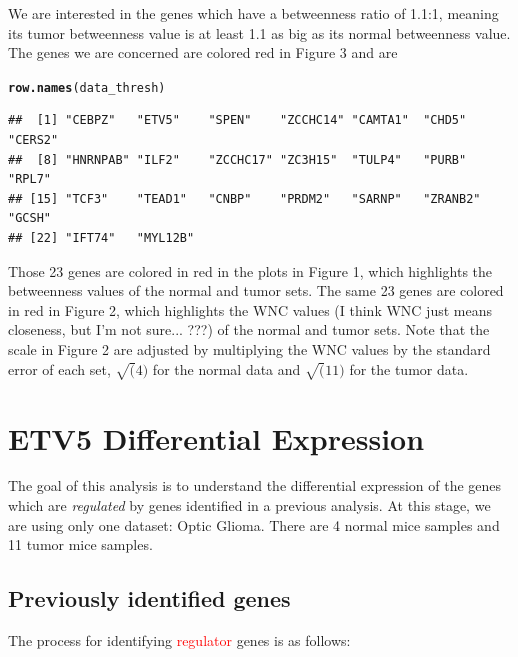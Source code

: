 \documentclass{article}\usepackage[]{graphicx}\usepackage[]{color}
\makeatletter
\newcommand{\hlstd}[1]{\textcolor[rgb]{0.345,0.345,0.345}{#1}}%
\newcommand{\hlkwd}[1]{\textcolor[rgb]{0.737,0.353,0.396}{\textbf{#1}}}%
\newenvironment{kframe}{%
 \def\at@end@of@kframe{}%
 \ifinner\ifhmode%
  \def\at@end@of@kframe{\end{minipage}}%
  \begin{minipage}{\columnwidth}%
 \fi\fi%
 \def\FrameCommand##1{\hskip\@totalleftmargin \hskip-\fboxsep
 \colorbox{shadecolor}{##1}\hskip-\fboxsep
     \hskip-\linewidth \hskip-\@totalleftmargin \hskip\columnwidth}%
 \MakeFramed {\advance\hsize-\width
   \@totalleftmargin\z@ \linewidth\hsize
   \@setminipage}}%
 {\par\unskip\endMakeFramed%
 \at@end@of@kframe}
\newenvironment{knitrout}{}{} %
\makeatother
\begin{document}
We are interested in the genes which have a betweenness ratio of 1.1:1, meaning its tumor betweenness value is at least 1.1 as big as its normal betweenness value. The genes we are concerned are colored red in Figure 3 and are
\begin{knitrout}\small
{}\color{fgcolor}\begin{kframe}
\begin{alltt}
\hlkwd{row.names}\hlstd{(data_thresh)}
\end{alltt}
\begin{verbatim}
##  [1] "CEBPZ"   "ETV5"    "SPEN"    "ZCCHC14" "CAMTA1"  "CHD5"    "CERS2"  
##  [8] "HNRNPAB" "ILF2"    "ZCCHC17" "ZC3H15"  "TULP4"   "PURB"    "RPL7"   
## [15] "TCF3"    "TEAD1"   "CNBP"    "PRDM2"   "SARNP"   "ZRANB2"  "GCSH"   
## [22] "IFT74"   "MYL12B"
\end{verbatim}
\end{kframe}
\end{knitrout}


Those 23 genes are colored in red in the plots in Figure 1, which highlights the betweenness values of the normal and tumor sets. The same 23 genes are colored in red in Figure 2, which highlights the WNC values (I think WNC just means closeness, but I'm not sure...  ???) of the normal and tumor sets. Note that the scale in Figure 2 are adjusted by multiplying the WNC values by the standard error of each set, $\sqrt(4)$ for the normal data and $\sqrt(11)$ for the tumor data.




\newpage
\section{ETV5 Differential Expression}

The goal of this analysis is to understand the differential expression of the genes which are {\em regulated} by genes identified in a previous analysis.  At this stage, we are using only one dataset:  Optic Glioma.  There are 4 normal mice samples and 11 tumor mice samples.


\subsection{Previously identified genes}
The process for identifying \textcolor{red}{regulator} genes is as follows:
\end{document}
